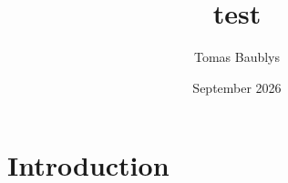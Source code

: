 \documentclass{article}
\title{test}
\author{Tomas Baublys}
\date{September 2026}
\begin{document}
\maketitle

\section{Introduction}
\end{document}
